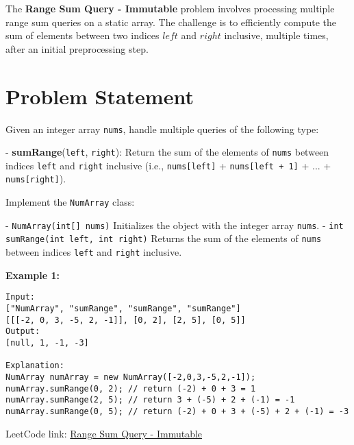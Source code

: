 
\label{problem:range_sum_query_immutable}

The \textbf{Range Sum Query - Immutable} problem involves processing multiple range sum queries on a static array. The challenge is to efficiently compute the sum of elements between two indices \( left \) and \( right \) inclusive, multiple times, after an initial preprocessing step.

\section*{Problem Statement}

Given an integer array \texttt{nums}, handle multiple queries of the following type:

- \textbf{sumRange}(\texttt{left}, \texttt{right}): Return the sum of the elements of \texttt{nums} between indices \texttt{left} and \texttt{right} inclusive (i.e., \texttt{nums[left]} + \texttt{nums[left + 1]} + ... + \texttt{nums[right]}).

Implement the \texttt{NumArray} class:

- \texttt{NumArray(int[] nums)} Initializes the object with the integer array \texttt{nums}.
- \texttt{int sumRange(int left, int right)} Returns the sum of the elements of \texttt{nums} between indices \texttt{left} and \texttt{right} inclusive.

\textbf{Example 1:}
\begin{verbatim}
Input:
["NumArray", "sumRange", "sumRange", "sumRange"]
[[[-2, 0, 3, -5, 2, -1]], [0, 2], [2, 5], [0, 5]]
Output:
[null, 1, -1, -3]

Explanation:
NumArray numArray = new NumArray([-2,0,3,-5,2,-1]);
numArray.sumRange(0, 2); // return (-2) + 0 + 3 = 1
numArray.sumRange(2, 5); // return 3 + (-5) + 2 + (-1) = -1
numArray.sumRange(0, 5); // return (-2) + 0 + 3 + (-5) + 2 + (-1) = -3
\end{verbatim}

LeetCode link: \href{https://leetcode.com/problems/range-sum-query-immutable/}{Range Sum Query - Immutable}


